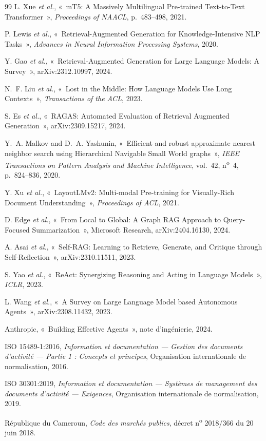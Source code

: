 \begin{thebibliography}{99}
L. Xue \textit{et al.},
«~mT5: A Massively Multilingual Pre-trained Text-to-Text Transformer~»,
\emph{Proceedings of NAACL}, p.~483--498, 2021.

P. Lewis \textit{et al.},
«~Retrieval-Augmented Generation for Knowledge-Intensive NLP Tasks~»,
\emph{Advances in Neural Information Processing Systems}, 2020.

Y. Gao \textit{et al.},
«~Retrieval-Augmented Generation for Large Language Models: A Survey~»,
arXiv:2312.10997, 2024.

N.~F. Liu \textit{et al.},
«~Lost in the Middle: How Language Models Use Long Contexts~»,
\emph{Transactions of the ACL}, 2023.

S. Es \textit{et al.},
«~RAGAS: Automated Evaluation of Retrieval Augmented Generation~»,
arXiv:2309.15217, 2024.

Y.~A. Malkov and D.~A. Yashunin,
«~Efficient and robust approximate nearest neighbor search using Hierarchical Navigable Small World graphs~»,
\emph{IEEE Transactions on Pattern Analysis and Machine Intelligence},
vol.~42, n\textsuperscript{o}~4, p.~824--836, 2020.

Y. Xu \textit{et al.},
«~LayoutLMv2: Multi-modal Pre-training for Visually-Rich Document Understanding~»,
\emph{Proceedings of ACL}, 2021.

D. Edge \textit{et al.},
«~From Local to Global: A Graph RAG Approach to Query-Focused Summarization~»,
Microsoft Research, arXiv:2404.16130, 2024.

A. Asai \textit{et al.},
«~Self-RAG: Learning to Retrieve, Generate, and Critique through Self-Reflection~»,
arXiv:2310.11511, 2023.

S. Yao \textit{et al.},
«~ReAct: Synergizing Reasoning and Acting in Language Models~»,
\emph{ICLR}, 2023.

L. Wang \textit{et al.},
«~A Survey on Large Language Model based Autonomous Agents~»,
arXiv:2308.11432, 2023.

Anthropic,
«~Building Effective Agents~»,
note d'ingénierie, 2024.

ISO 15489-1:2016,
\emph{Information et documentation --- Gestion des documents d'activité --- Partie 1 : Concepts et principes},
Organisation internationale de normalisation, 2016.

ISO 30301:2019,
\emph{Information et documentation --- Systèmes de management des documents d'activité --- Exigences},
Organisation internationale de normalisation, 2019.

République du Cameroun,
\emph{Code des marchés publics},
décret n\textsuperscript{o} 2018/366 du 20 juin 2018.

\end{thebibliography}
\clearpage

